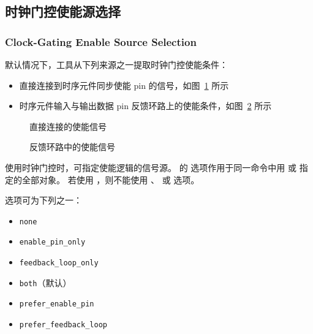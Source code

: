 \subsection{时钟门控使能源选择}
\subsubsection*{Clock-Gating Enable Source Selection}

默认情况下，工具从下列来源之一提取时钟门控使能条件：
\begin{itemize}
  \item 直接连接到时序元件同步使能 pin 的信号，如图~\ref{fig:cg-en-direct} 所示
  \item 时序元件输入与输出数据 pin 反馈环路上的使能条件，如图~\ref{fig:cg-en-feedback} 所示
\end{itemize}

\begin{figure}[htbp]
\centering
{}
\caption{直接连接的使能信号}
\label{fig:cg-en-direct}
\end{figure}

\begin{figure}[htbp]
\centering
{}
\caption{反馈环路中的使能信号}
\label{fig:cg-en-feedback}
\end{figure}

使用时钟门控时，可指定使能逻辑的信号源。
 的  选项作用于同一命令中用  或  指定的全部对象。
若使用 ，则不能使用 、 或  选项。

 选项可为下列之一：
\begin{itemize}
  \item \texttt{none}
  \item \texttt{enable\_pin\_only}
  \item \texttt{feedback\_loop\_only}
  \item \texttt{both}（默认）
  \item \texttt{prefer\_enable\_pin}
  \item \texttt{prefer\_feedback\_loop}
\end{itemize}

